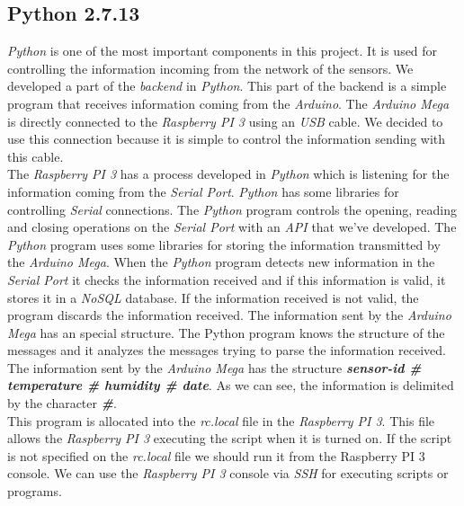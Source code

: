 \subsection{Python 2.7.13}

\textit{Python} is one of the most important components in this project. It is used for controlling the information incoming from the network of the sensors. We developed a part of the \textit{backend} in \textit{Python}. This part of the backend is a simple program that receives information coming from the \textit{Arduino}. The \textit{Arduino Mega} is directly connected to the \textit{Raspberry PI 3} using an \textit{USB} cable. We decided to use this connection because it is simple to control the information sending with this cable.\\

The \textit{Raspberry PI 3} has a process developed in \textit{Python} which is listening for the information coming from the \textit{Serial Port}. \textit{Python} has some libraries for controlling \textit{Serial} connections. The \textit{Python} program controls the opening, reading and closing operations on the \textit{Serial Port} with an \textit{API} that we've developed. The \textit{Python} program uses some libraries for storing the information transmitted by the \textit{Arduino Mega}. When the \textit{Python} program detects new information in the \textit{Serial Port} it checks the information received and if this information is valid, it stores it in a \textit{NoSQL} database. If the information received is not valid, the program discards the information received. The information sent by the \textit{Arduino Mega} has an special structure. The Python program knows the structure of the messages and it analyzes the messages trying to parse the information received.\\

The information sent by the \textit{Arduino Mega} has the structure \textit{\textbf{sensor-id \# temperature \# humidity \# date}}. As we can see, the information is delimited by the character \textbf{\textit{\#}}.\\

This program is allocated into the \textit{rc.local} file in the \textit{Raspberry PI 3}. This file allows the \textit{Raspberry PI 3} executing the script when it is turned on. If the script is not specified on the \textit{rc.local} file we should run it from the Raspberry PI 3 console. We can use the \textit{Raspberry PI 3} console via \textit{SSH} for executing scripts or programs.\\

